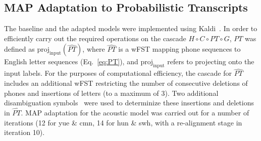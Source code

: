 \subsection{MAP Adaptation to Probabilistic Transcripts}
\label{sec:ptadapt}

The baseline and the adapted models were implemented using
Kaldi~\cite{Kaldi2011}. In order to efficiently carry out the required
operations on the cascade $H\circ C\circ PT\circ G$, $PT$ was defined
as $\mathrm{proj}_{\mathrm{input}} (\widehat{PT})$, where
$\widehat{PT}$ is a wFST mapping phone sequences to English letter
sequences (Eq.~\ref{eq:PT}), and $\mathrm{proj}_{\mathrm{input}}$
refers to projecting onto the input labels. For the purposes of
computational efficiency, the cascade for $\widehat{PT}$ includes an
additional wFST restricting the number of consecutive deletions of
phones and insertions of letters (to a maximum of 3). Two additional
disambiguation symbols~\cite{mohri2008speech} were used to determinize
these insertions and deletions in $\widehat{PT}$. MAP adaptation for
the acoustic model was carried out for a number of iterations (12 for
yue \& cmn, 14 for hun \& swh, with a re-alignment stage in iteration
10).
